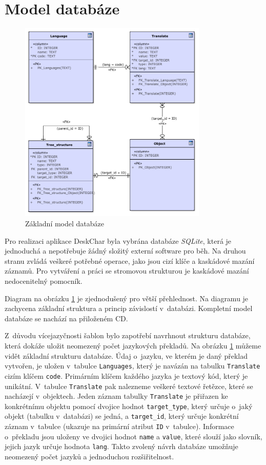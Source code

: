 \documentclass[thesis=B,czech]{resources/FITthesis}[2012/06/26]
\begin{document}
	\section{Model databáze}
	\begin{figure}\centering
	\includegraphics[width=0.8\textwidth]{images/basic_database}
	\caption[Základní model databáze]{Základní model databáze}\label{fig:db_basic}
	\end{figure}
	Pro realizaci aplikace DeskChar byla vybrána databáze \textit{SQLite}, která je jednoduchá a nepotřebuje žádný složitý externí software pro běh. Na druhou stranu zvládá veškeré potřebné operace, jako jsou cizí klíče a kaskádové mazání záznamů. Pro vytváření a práci se stromovou strukturou je kaskádové mazání nedocenitelný pomocník. \par

Diagram na obrázku \ref{fig:db_basic} je zjednodušený pro větší přehlednost. Na diagramu je zachycena základní struktura a princip závislostí v~databázi. Kompletní model databáze se nachází na přiloženém CD.\par

Z~důvodu vícejazyčnosti šablon bylo zapotřebí navrhnout strukturu databáze, která dokáže uložit neomezený počet jazykových překladů. Na obrázku \ref{fig:db_basic} můžeme vidět základní strukturu databáze. Údaj o~jazyku, ve kterém je daný překlad vytvořen, je uložen v~tabulce \texttt{Languages}, který je navázán na tabulku \texttt{Translate} cizím klíčem \texttt{code}. Primárním klíčem každého jazyka je textový kód, který je unikátní. V~tabulce \texttt{Translate} pak nalezneme veškeré textové řetězce, které se nacházejí v~objektech. Jeden záznam tabulky \texttt{Translate} je přiřazen ke konkrétnímu objektu pomocí dvojice hodnot \texttt{target\_type}, který určuje o~jaký objekt (tabulku v~databázi) se jedná, a \texttt{target\_id}, který určuje konkrétní záznam v~tabulce (ukazuje na primární atribut \texttt{ID} v~tabulce). Informace o~překladu jsou uloženy ve dvojici hodnot \texttt{name} a \texttt{value}, které slouží jako slovník, jejich jazyk určuje hodnota \texttt{lang}. Takto zvolený návrh databáze umožňuje neomezený počet jazyků a jednoduchou rozšiřitelnost.\par
\end{document}
